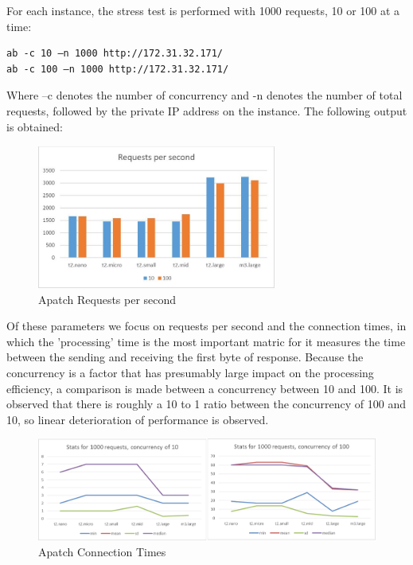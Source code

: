 \documentclass[10pt,letterpaper]{article}
\begin{document}
For each instance, the stress test is performed with 1000 requests, 10 or 100 at a time:

\begin{lstlisting}
ab -c 10 –n 1000 http://172.31.32.171/
ab -c 100 –n 1000 http://172.31.32.171/
\end{lstlisting}

Where –c denotes the number of concurrency and -n denotes the number of total requests, followed by the private IP address on the instance. The following output is obtained:
	
	\begin{figure}[!h]
	\includegraphics[width=0.7\textwidth]{ab_rs.jpg}
	\centering
	\caption{Apatch Requests per second}
	\end{figure}
	
	Of these parameters we focus on requests per second and the connection times, in which the 'processing' time is the most important matric for it measures the time between the sending and receiving the first byte of response. Because the concurrency is a factor that has presumably large impact on the processing efficiency, a comparison is made between a concurrency between 10 and 100. It is observed that there is roughly a 10 to 1 ratio between the concurrency of 100 and 10, so linear deterioration of performance is observed. 
	
	\begin{figure}[!h]
	\includegraphics[width=\textwidth]{AB_result.png}
	\centering
	\caption{Apatch Connection Times}
	\end{figure}
\end{document}
